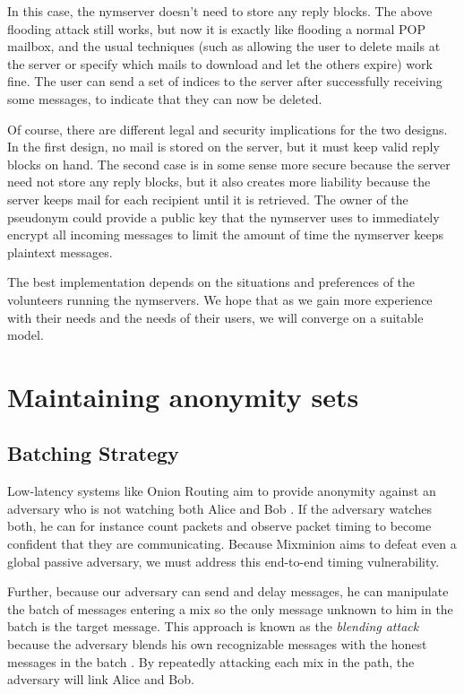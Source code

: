 \documentclass[final]{ieee}
\begin{document}
In this case, the nymserver doesn't need to store any reply blocks.
The above flooding attack still works, but now it is exactly
like flooding a normal POP mailbox, and the usual techniques (such as
allowing the user to delete mails at the server or specify which mails to
download and let the others expire) work fine. The user can send a set
of indices to the server after successfully receiving
some messages, to indicate that they can now be deleted.

Of course, there are different legal and security implications for the two
designs. In the first design, no mail is stored on the server, but it must
keep valid reply blocks on hand. The second case is in some sense more
secure because the server need not store any reply blocks, but it also
creates more liability because the server keeps mail for each recipient
until it is retrieved. The owner of the pseudonym could provide a public
key that the nymserver uses to immediately encrypt all incoming messages
to limit the amount of time the nymserver keeps plaintext messages.

The best implementation depends on the situations and preferences of the
volunteers running the nymservers.  We hope that as we gain more experience
with their needs and the needs of their users, we will converge on a suitable
model.


\section{Maintaining anonymity sets}
\label{sec:maintaining-anonymity}

\subsection{Batching Strategy}
\label{subsec:batching}

Low-latency systems like Onion Routing aim to provide anonymity against an
adversary who is not watching both Alice and Bob \cite{syverson_2000}. If
the adversary watches both, he can for instance count packets and observe
packet timing to become confident that they are communicating. Because
Mixminion aims to defeat even a global passive adversary, we must address
this end-to-end timing vulnerability.

Further, because our adversary can send and delay messages,
he can manipulate the batch of messages entering a mix so the only message
unknown to him in the batch is the target message. This approach is
known as the \emph{blending attack} because the adversary blends his
own recognizable messages with the honest messages in the batch
\cite{trickle02}. By repeatedly
attacking each mix in the path, the adversary will link Alice and Bob.
\end{document}
